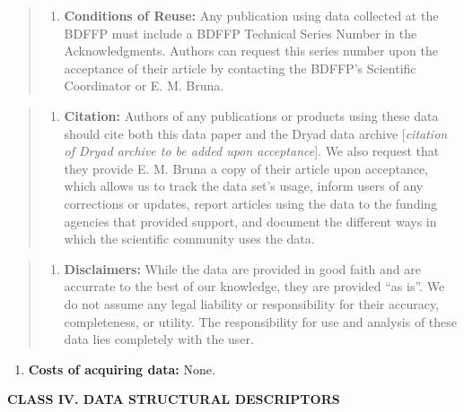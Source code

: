 \documentclass[
  12pt,
  man, donotrepeattitle,floatsintext]{apa6}
\providecommand{\tightlist}{%
  \setlength{\itemsep}{0pt}\setlength{\parskip}{0pt}}
\begin{document}
\begin{quote}
\begin{enumerate}
\def\labelenumi{\alph{enumi}.}
\tightlist
\item
  \textbf{Conditions of Reuse:} Any publication using data collected at the BDFFP must include a BDFFP Technical Series Number in the Acknowledgments. Authors can request this series number upon the acceptance of their article by contacting the BDFFP's Scientific Coordinator or E. M. Bruna.
\end{enumerate}
\end{quote}

\begin{quote}
\begin{enumerate}
\def\labelenumi{\alph{enumi}.}
\setcounter{enumi}{1}
\tightlist
\item
  \textbf{Citation:} Authors of any publications or products using these data should cite both this data paper and the Dryad data archive {[}\emph{citation of Dryad archive to be added upon acceptance}{]}. We also request that they provide E. M. Bruna a copy of their article upon acceptance, which allows us to track the data set's usage, inform users of any corrections or updates, report articles using the data to the funding agencies that provided support, and document the different ways in which the scientific community uses the data.
\end{enumerate}
\end{quote}

\begin{quote}
\begin{enumerate}
\def\labelenumi{\alph{enumi}.}
\setcounter{enumi}{2}
\tightlist
\item
  \textbf{Disclaimers:} While the data are provided in good faith and are accurrate to the best of our knowledge, they are provided ``as is''. We do not assume any legal liability or responsibility for their accuracy, completeness, or utility. The responsibility for use and analysis of these data lies completely with the user.
\end{enumerate}
\end{quote}

\begin{enumerate}
\def\labelenumi{\arabic{enumi}.}
\setcounter{enumi}{4}
\tightlist
\item
  \textbf{Costs of acquiring data:} None.
\end{enumerate}

\noindent  
\textbf{CLASS IV. DATA STRUCTURAL DESCRIPTORS}
\end{document}
